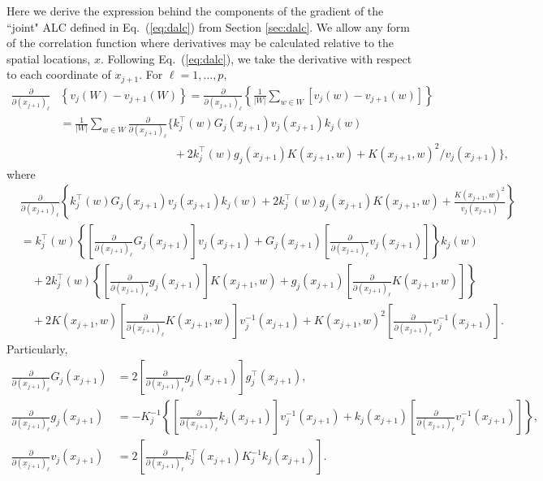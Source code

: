 \documentclass[12pt]{article}
\begin{document}
Here we derive the expression behind the components of the gradient of the
``joint" ALC defined in Eq.~(\ref{eq:dalc}) from Section \ref{sec:dalc}.  We 
allow any form of the correlation function where derivatives may be calculated 
relative to the spatial locations, $x$.  Following Eq.~(\ref{eq:dalc}), we take
the derivative with respect to each coordinate of $x_{j+1}$. For
$\ell=1, \dots, p$,
\begin{align*}
\frac{\partial}{\partial (x_{j+1})_\ell} &\left\{v_j(W) - v_{j+1}(W)\right\} 
= \frac{\partial}{\partial (x_{j+1})_\ell} \left\{\frac{1}{|W|}\sum_{w \in W} \left[v_j(w)-v_{j+1}(w)\right] \right\} \\
&=  \frac{1}{|W|}\sum_{w \in W} \frac{\partial}{\partial (x_{j+1})_\ell}\Big\{  k_j^\top(w)G_j(x_{j+1})v_j(x_{j+1})k_j(w) \\ 
& \quad\quad\quad\quad\quad\quad\quad\quad\quad\quad
 + 2k_j^\top(w)g_j(x_{j+1})K(x_{j+1}, w) + K(x_{j+1}, w)^2/ v_j(x_{j+1}) \Big\},
\end{align*}
where
\begin{align}
&\frac{\partial}{\partial (x_{j+1})_\ell}\left\{k_j^\top(w)G_j(x_{j+1})v_j(x_{j+1})k_j(w) + 2k_j^\top(w)g_j(x_{j+1})K(x_{j+1}, w) + \frac{K(x_{j+1}, w)^2}{v_j(x_{j+1})} \right\} \label{eq:dds1}\\
&= k_j^\top(w)\left\{ \left [\frac{\partial}{\partial (x_{j+1})_\ell} G_j(x_{j+1})\right]v_j(x_{j+1})+G_j(x_{j+1})\left[\frac{\partial}{\partial (x_{j+1})_\ell} v_j(x_{j+1})\right]\right\}k_j(w) \nonumber \\
&\quad +2k_j^\top(w)\left\{\left [\frac{\partial}{\partial (x_{j+1})_\ell} g_j(x_{j+1})\right]K(x_{j+1}, w)+g_j(x_{j+1})\left [\frac{\partial}{\partial (x_{j+1})_\ell} K(x_{j+1}, w)\right]\right\} \nonumber\\
&\quad +2K(x_{j+1}, w)\left[\frac{\partial}{\partial (x_{j+1})_\ell} K(x_{j+1}, w)\right] v_j^{-1}(x_{j+1})+K(x_{j+1}, w)^2\left[\frac{\partial}{\partial (x_{j+1})_\ell} v_j^{-1}(x_{j+1})\right]. \nonumber 
\end{align}
Particularly,
\begin{align}
\frac{\partial}{\partial (x_{j+1})_\ell} G_j(x_{j+1})&=2\left[\frac{\partial}{\partial (x_{j+1})_\ell} g_j(x_{j+1})\right]g^\top_j(x_{j+1}),\label{eq:dds11}\\
\frac{\partial}{\partial (x_{j+1})_\ell} g_j(x_{j+1})&=-K^{-1}_j\left\{\!\left[\frac{\partial}{\partial (x_{j+1})_\ell} k_j(x_{j+1})\right]v_j^{-1}(x_{j+1})+k_j(x_{j+1})\left[\frac{\partial}{\partial (x_{j+1})_\ell} v_j^{-1}(x_{j+1})\right]\!\right\}, \nonumber \\
\frac{\partial}{\partial (x_{j+1})_\ell} v_j(x_{j+1})&=2\left[\frac{\partial}{\partial (x_{j+1})_\ell} k^\top_j (x_{j+1}) K_j^{-1} k_j (x_{j+1})\right]. \label{eq:dds13}
\end{align}
\end{document}
